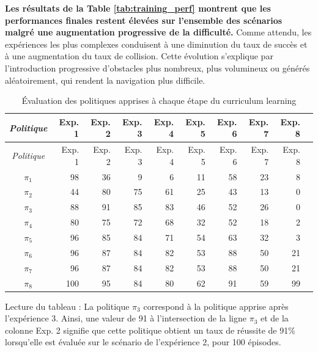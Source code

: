 \vspace{10pt}

\noindent \textbf{Les résultats de la Table \ref{tab:training_perf} montrent que les performances finales restent élevées sur l'ensemble des scénarios malgré une augmentation progressive de la difficulté.} Comme attendu, les expériences les plus complexes conduisent à une diminution du taux de succès et à une augmentation du taux de collision. Cette évolution s'explique par l'introduction progressive d'obstacles plus nombreux, plus volumineux ou générés aléatoirement, qui rendent la navigation plus difficile.

\begin{longtable}{crrrrrrrrr}

    \caption{Évaluation des politiques apprises à chaque étape du curriculum learning} \label{tab:curriculum_perf} \\
    \toprule
    \textit{Politique} & Exp. 1 & Exp. 2 & Exp. 3 & Exp. 4 & Exp. 5 & Exp. 6 & Exp. 7 & Exp. 8                     \\
    \midrule
    \endfirsthead
    \toprule
    \textit{Politique} & Exp. 1 & Exp. 2 & Exp. 3 & Exp. 4 & Exp. 5 & Exp. 6 & Exp. 7 & Exp. 8                     \\
    \midrule
    \endhead
    \midrule
    \endfoot
    \bottomrule
    \endlastfoot

    $\pi_1$            & 98     & 36     & 9      & 6      & 11     & 58     & 23     & 8                          \\
    \midrule
    $\pi_2$            & 44     & 80     & 75     & 61     & 25     & 43     & 13     & 0                          \\
    \midrule
    $\pi_3$            & 88     & 91     & 85     & 83     & 46     & 52     & 26     & 0                          \\
    \midrule
    $\pi_4$            & 80     & 75     & 72     & 68     & 32     & 52     & 18     & 2                          \\
    \midrule
    $\pi_5$            & 96     & 85     & 84     & 71     & 54     & 63     & 32     & 3                          \\
    \midrule
    $\pi_6$            & 96     & 87     & 84     & 82     & 53     & 88     & 50     & 21                         \\
    \midrule
    $\pi_7$            & 96     & 87     & 84     & 82     & 53     & 88     & 50     & 21                         \\
    \midrule
    $\pi_8$            & 100    & 95     & 84     & 80     & 62     & 91     & 59     & 99                         \\
\end{longtable}
\vspace{-10pt}
{
    \footnotesize
    \color{darkgray}
    \noindent Lecture du tableau : La politique $\pi_3$ correspond à la politique apprise après l'expérience 3. Ainsi, une valeur de 91 à l'intersection de la ligne $\pi_3$ et de la colonne Exp. 2 signifie que cette politique obtient un taux de réussite de 91\% lorsqu'elle est évaluée sur le scénario de l'expérience 2, pour 100 épisodes.
}

